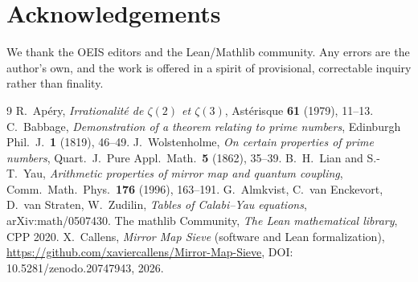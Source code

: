 \documentclass[11pt,a4paper]{article}
\theoremstyle{definition}
\theoremstyle{remark}
\begin{document}
\section*{Acknowledgements}
We thank the OEIS editors and the Lean/Mathlib community.  Any errors are the
author's own, and the work is offered in a spirit of provisional, correctable
inquiry rather than finality.

\begin{thebibliography}{9}
 R.~Ap\'ery, \emph{Irrationalit\'e de $\zeta(2)$ et
  $\zeta(3)$}, Ast\'erisque \textbf{61} (1979), 11--13.
 C.~Babbage, \emph{Demonstration of a theorem relating to
  prime numbers}, Edinburgh Phil.\ J.\ \textbf{1} (1819), 46--49.
 J.~Wolstenholme, \emph{On certain properties of prime
  numbers}, Quart.\ J.\ Pure Appl.\ Math.\ \textbf{5} (1862), 35--39.
 B.~H.~Lian and S.-T.~Yau, \emph{Arithmetic properties of
  mirror map and quantum coupling}, Comm.\ Math.\ Phys.\ \textbf{176} (1996),
  163--191.
 G.~Almkvist, C.~van Enckevort, D.~van Straten,
  W.~Zudilin, \emph{Tables of Calabi--Yau equations}, arXiv:math/0507430.
 The mathlib Community, \emph{The Lean mathematical library},
  CPP 2020.
 X.~Callens, \emph{Mirror Map Sieve} (software and Lean
  formalization), \url{https://github.com/xaviercallens/Mirror-Map-Sieve},
  DOI:\,10.5281/zenodo.20747943, 2026.
\end{thebibliography}
\end{document}
